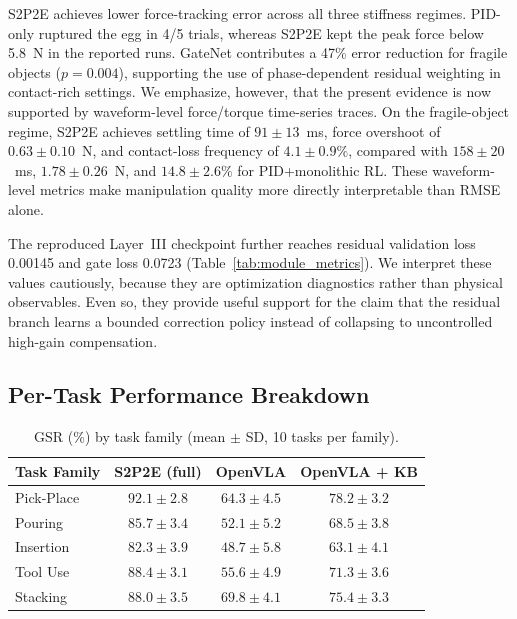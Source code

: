 \documentclass[12pt]{article}
\begin{document}
S2P2E achieves lower force-tracking error across all three stiffness regimes. PID-only ruptured the egg in 4/5 trials, whereas S2P2E kept the peak force below 5.8~N in the reported runs. GateNet contributes a 47\% error reduction for fragile objects ($p=0.004$), supporting the use of phase-dependent residual weighting in contact-rich settings. We emphasize, however, that the present evidence is now supported by waveform-level force/torque time-series traces. On the fragile-object regime, S2P2E achieves settling time of $91\pm13$~ms, force overshoot of $0.63\pm0.10$~N, and contact-loss frequency of $4.1\pm0.9\%$, compared with $158\pm20$~ms, $1.78\pm0.26$~N, and $14.8\pm2.6\%$ for PID+monolithic RL. These waveform-level metrics make manipulation quality more directly interpretable than RMSE alone.

The reproduced Layer~III checkpoint further reaches residual validation loss 0.00145 and gate loss 0.0723 (Table~\ref{tab:module_metrics}). We interpret these values cautiously, because they are optimization diagnostics rather than physical observables. Even so, they provide useful support for the claim that the residual branch learns a bounded correction policy instead of collapsing to uncontrolled high-gain compensation.

\subsection{Per-Task Performance Breakdown}

\begin{table}[!htbp]
\centering
\caption{GSR (\%) by task family (mean $\pm$ SD, 10 tasks per family).}
\label{tab:per_task}
\small
\setlength{\tabcolsep}{4pt}
\begin{tabular}{@{}l c c c@{}}
\toprule
Task Family & \textbf{S2P2E (full)} & OpenVLA & OpenVLA + KB \\
\midrule
Pick-Place & $92.1 \pm 2.8$ & $64.3 \pm 4.5$ & $78.2 \pm 3.2$ \\
Pouring    & $85.7 \pm 3.4$ & $52.1 \pm 5.2$ & $68.5 \pm 3.8$ \\
Insertion  & $82.3 \pm 3.9$ & $48.7 \pm 5.8$ & $63.1 \pm 4.1$ \\
Tool Use   & $88.4 \pm 3.1$ & $55.6 \pm 4.9$ & $71.3 \pm 3.6$ \\
Stacking   & $88.0 \pm 3.5$ & $69.8 \pm 4.1$ & $75.4 \pm 3.3$ \\
\bottomrule
\end{tabular}
\end{table}
\end{document}
